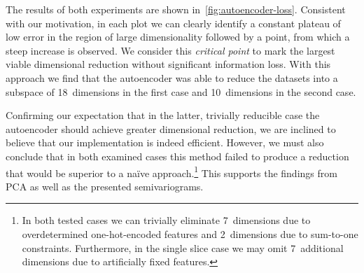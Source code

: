 The results of both experiments are shown in~\cref{fig:autoencoder-loss}.
Consistent with our motivation, in each plot we can clearly identify a constant
plateau of low error in the region of large dimensionality followed by a point,
from which a steep increase is observed.
We consider this \textit{critical point} to mark the largest viable
dimensional reduction without significant information loss.
With this approach we find that the autoencoder was able to reduce the
datasets into a subspace of 18~dimensions in the first case and 10~dimensions in
the second case.

Confirming our expectation that in the latter, trivially reducible case the
autoencoder should achieve greater dimensional reduction, we are inclined to
believe that our implementation is indeed efficient. However, we
must also conclude that in both examined cases this method failed to produce a
reduction that would be superior to a naïve approach.\footnote{In both tested cases we
	can trivially eliminate 7~dimensions due to overdetermined one-hot-encoded
	features and 2~dimensions due to sum-to-one constraints. Furthermore, in the
	single slice case we may omit 7~additional dimensions due to artificially fixed
features.} This supports the findings from PCA as well as the
presented semivariograms.



